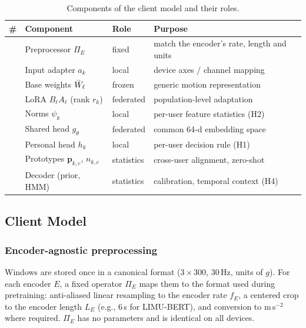 \begin{table}[!t]
\centering
\caption{Components of the \method{} client model and their roles.}
\label{tab:roles}
\footnotesize
\setlength{\tabcolsep}{3.5pt}
\renewcommand{\arraystretch}{1.1}
\begin{tabularx}{\columnwidth}{@{}l l l Y@{}}
\toprule
\# & Component & Role & Purpose \\
\midrule
{} & Preprocessor $\Pi_E$ & fixed & match the encoder's rate, length and units \\
 & Input adapter $a_k$ & local & device axes / channel mapping \\
 & Base weights $\bar{W}_\ell$ & frozen & generic motion representation \\
           & LoRA $B_\ell A_\ell$ (rank $r_k$) & federated & population-level adaptation \\
           & Norms $\psi_k$ & local & per-user feature statistics (H2) \\
 & Shared head $g_\theta$ & federated & common 64-d embedding space \\
 & Personal head $h_k$ & local & per-user decision rule (H1) \\
 & Prototypes $\mathbf{p}_{k,c}$, $n_{k,c}$ & statistics & cross-user alignment, zero-shot \\
 & Decoder (prior, HMM) & statistics & calibration, temporal context (H4) \\
\bottomrule
\end{tabularx}
\end{table}

\subsection{Client Model}\label{sec:method:client}

\subsubsection{Encoder-agnostic preprocessing }
Windows are stored once in a canonical format ($3\times300$, $30$\,Hz, units of $g$). For each
encoder $E$, a fixed operator $\Pi_E$ maps them to the format used during pretraining:
anti-aliased linear resampling to the encoder rate $f_E$, a centered crop to the encoder length
$L_E$ (e.g., $6$\,s for LIMU-BERT), and conversion to m\,s$^{-2}$ where required. $\Pi_E$ has no
parameters and is identical on all devices.


